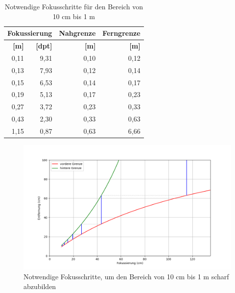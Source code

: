 \documentclass[./00PhotoBox.tex]{subfiles}
\begin{document}
\begin{table}
    \centering
    \caption{Notwendige Fokusschritte für den Bereich von 10 cm bis 1 m}
    \label{tab:fokusstack}
    \begin{tabular}{rr|r|r}
        \multicolumn{2}{c|}{\textbf{Fokussierung}} & \multicolumn{1}{c|}{\textbf{Nahgrenze}} & \multicolumn{1}{c}{\textbf{Ferngrenze}}                    \\ \hline
        \multicolumn{1}{r|}{\textbf{{[}m{]}}}      & \textbf{{[}dpt{]}}                      & \textbf{{[}m{]}}                        & \textbf{{[}m{]}} \\ \hline
        \multicolumn{1}{r|}{0,11}                  & 9,31                                    & 0,10                                    & 0,12             \\
        \multicolumn{1}{r|}{0,13}                  & 7,93                                    & 0,12                                    & 0,14             \\
        \multicolumn{1}{r|}{0,15}                  & 6,53                                    & 0,14                                    & 0,17             \\
        \multicolumn{1}{r|}{0,19}                  & 5,13                                    & 0,17                                    & 0,23             \\
        \multicolumn{1}{r|}{0,27}                  & 3,72                                    & 0,23                                    & 0,33             \\
        \multicolumn{1}{r|}{0,43}                  & 2,30                                    & 0,33                                    & 0,63             \\
        \multicolumn{1}{r|}{1,15}                  & 0,87                                    & 0,63                                    & 6,66
    \end{tabular}
\end{table}

\begin{figure}
    \centering
    \includegraphics[width=1\textwidth]{./img/fokusstack_plot.png}
    \caption{Notwendige Fokusschritte, um den Bereich von 10 cm bis 1 m scharf abzubilden} %
    \label{img:fokusstack_plot} %
\end{figure}
\end{document}
